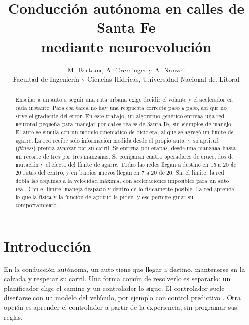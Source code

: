 \documentclass[final]{article}
\begin{document}
\def\tablename{Tabla}          %

\title{Conducción autónoma en calles de Santa Fe\\
       mediante neuroevolución}

\author{M. Bertona, A. Greminger y A. Nanzer \\
        Facultad de Ingeniería y Ciencias Hídricas,
        Universidad Nacional del Litoral}

\maketitle

\begin{abstract}
Enseñar a un auto a seguir una ruta urbana exige decidir el volante y el acelerador en cada instante.
Para esa tarea no hay una respuesta correcta paso a paso, así que no sirve el gradiente del error.
En este trabajo, un algoritmo genético entrena una red neuronal pequeña para manejar por calles reales de Santa Fe, sin ejemplos de manejo.
El auto se simula con un modelo cinemático de bicicleta, al que se agregó un límite de agarre.
La red recibe solo información medida desde el propio auto, y su aptitud (\emph{fitness}) premia avanzar por su carril.
Se entrena por etapas, desde una manzana hasta un recorte de tres por tres manzanas.
Se comparan cuatro operadores de cruce, dos de mutación y el efecto del límite de agarre.
Todas las redes llegan a destino en 15 a 20 de 20 rutas del centro, y en barrios nuevos llegan en 7 a 20 de 20.
Sin el límite, la red dobla las esquinas a la velocidad máxima, con aceleraciones imposibles para un auto real.
Con el límite, maneja despacio y dentro de lo físicamente posible.
La red aprende lo que la física y la función de aptitud le piden, y eso permite guiar su comportamiento.
\end{abstract}

\section{Introducción}

En la conducción autónoma, un auto tiene que llegar a destino, mantenerse en la calzada y respetar su carril.
Una forma común de resolverlo es separarlo: un planificador elige el camino y un controlador lo sigue.
El controlador suele diseñarse con un modelo del vehículo, por ejemplo con control predictivo \cite[p.~1097]{kong2015}.
Otra opción es aprender el controlador a partir de la experiencia, sin programar sus reglas.
\end{document}
